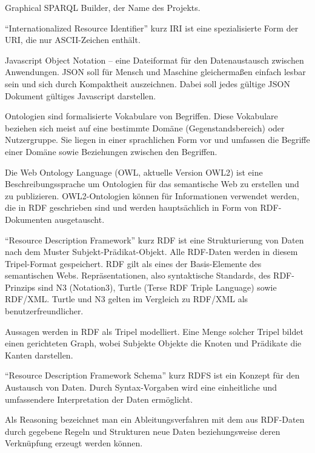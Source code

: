 {Graphical SPARQL Builder, der Name des Projekts. \cite{swp14-gsb}}

{“Internationalized Resource Identifier” kurz IRI ist eine spezialisierte Form der URI, die
 nur ASCII-Zeichen enthält. \cite{iri,rfc3987}}

{Javascript Object Notation -- eine Dateiformat für den Datenaustausch zwischen Anwendungen. JSON soll für Mensch und Maschine gleichermaßen einfach lesbar sein und sich durch Kompaktheit auszeichnen. Dabei soll jedes gültige JSON Dokument gültiges Javascript darstellen.
\cite{json}
}

{Ontologien sind formalisierte Vokabulare von Begriffen. Diese Vokabulare beziehen sich meist auf eine bestimmte Domäne (Gegenstandsbereich) oder Nutzergruppe. Sie liegen in einer sprachlichen Form vor und umfassen die Begriffe einer Domäne sowie Beziehungen zwischen den Begriffen. \cite{owl,ontologie-wiki,fraunhofer}
}

{Die Web Ontology Language (OWL, aktuelle Version OWL2) ist eine Beschreibungssprache um Ontologien für das semantische Web zu erstellen und zu publizieren. OWL2-Ontologien können für Informationen verwendet werden, die in RDF geschrieben sind und werden hauptsächlich in Form von RDF-Dokumenten ausgetauscht.
\cite{owl}
}

{“Resource Description Framework” kurz RDF ist eine Strukturierung von Daten nach
dem Muster Subjekt-Prädikat-Objekt. Alle RDF-Daten werden in diesem Tripel-Format 
gespeichert. RDF gilt als eines der Basis-Elemente des semantischen Webs.
Repräsentationen, also syntaktische Standards, des RDF-Prinzips sind N3 (Notation3), 
Turtle (Terse RDF Triple Language) sowie RDF/XML. Turtle und N3 gelten im Vergleich zu RDF/XML als benutzerfreundlicher. \cite{rdf-primer,rdf-wiki,rdf-xml-wiki}}

{Aussagen werden in RDF als Tripel modelliert. Eine Menge solcher Tripel bildet einen gerichteten Graph, wobei Subjekte Objekte die Knoten und Prädikate die Kanten darstellen. \cite{rdf-wiki}}

{“Resource Description Framework Schema” kurz RDFS ist ein Konzept für den 
Austausch von Daten. Durch Syntax-Vorgaben wird eine einheitliche und umfassendere
Interpretation der Daten ermöglicht. \cite{w3c-rdf-schema}}

{Als Reasoning bezeichnet man ein Ableitungsverfahren mit dem aus RDF-Daten durch gegebene Regeln und Strukturen neue Daten beziehungsweise deren Verknüpfung erzeugt werden können. \cite{reasoning-paper,rdf-reasoning}}

